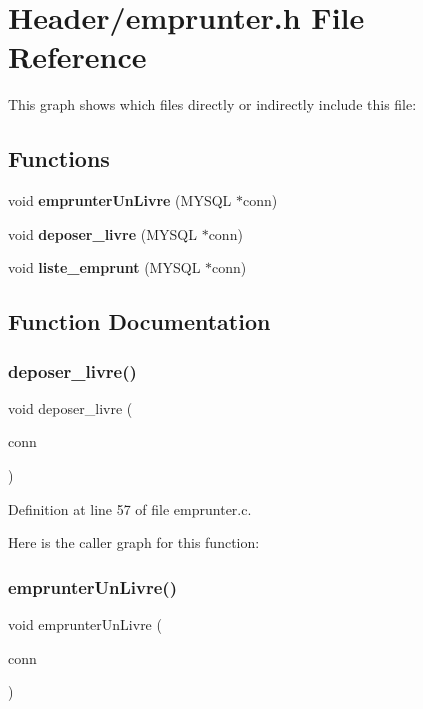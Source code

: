 \section{Header/emprunter.h File Reference}
\label{emprunter_8h}
This graph shows which files directly or indirectly include this file\+:
\subsection*{Functions}
\begin{DoxyCompactItemize}
\item 
void \textbf{ emprunter\+Un\+Livre} (M\+Y\+S\+QL $\ast$conn)
\item 
void \textbf{ deposer\+\_\+livre} (M\+Y\+S\+QL $\ast$conn)
\item 
void \textbf{ liste\+\_\+emprunt} (M\+Y\+S\+QL $\ast$conn)
\end{DoxyCompactItemize}


\subsection{Function Documentation}
\mbox{\label{emprunter_8h_a681dc4003fbc86be8328f7539f821614}} 
\subsubsection{deposer\+\_\+livre()}
{\footnotesize\ttfamily void deposer\+\_\+livre (\begin{DoxyParamCaption}\item[{M\+Y\+S\+QL $\ast$}]{conn }\end{DoxyParamCaption})}



Definition at line 57 of file emprunter.\+c.

Here is the caller graph for this function\+:
\mbox{\label{emprunter_8h_a0ad6d357ae8f1a1fbaa0c89045bb0a44}} 
\subsubsection{emprunter\+Un\+Livre()}
{\footnotesize\ttfamily void emprunter\+Un\+Livre (\begin{DoxyParamCaption}\item[{M\+Y\+S\+QL $\ast$}]{conn }\end{DoxyParamCaption})}



